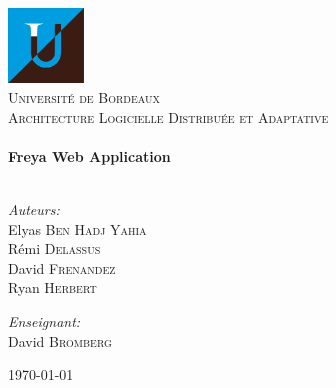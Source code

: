 \begin{titlepage}
\begin{center}

\includegraphics[width=0.15\textwidth]{./resources/ub.png}~\\[1cm]

\textsc{\LARGE Université de Bordeaux}\\[1.5cm]

\textsc{\Large {Architecture Logicielle Distribuée et Adaptative}}\\[0.5cm]

\HRule \\[0.4cm]
{ \huge \bfseries Freya Web Application}\\[0.4cm]

\HRule \\[1.5cm]

\begin{minipage}{0.4\textwidth}
\begin{flushleft} \large
\emph{Auteurs:} \\
Elyas \textsc{Ben Hadj Yahia}\\
Rémi \textsc{Delassus}\\
David \textsc{Frenandez}\\
Ryan \textsc{Herbert}
\end{flushleft}
\end{minipage}
\begin{minipage}{0.4\textwidth}
\begin{flushright} \large
\emph{Enseignant:} \\
David \textsc{Bromberg}\\
\end{flushright}
\end{minipage}

\vfill

{\large \today}

\end{center}
\end{titlepage}
